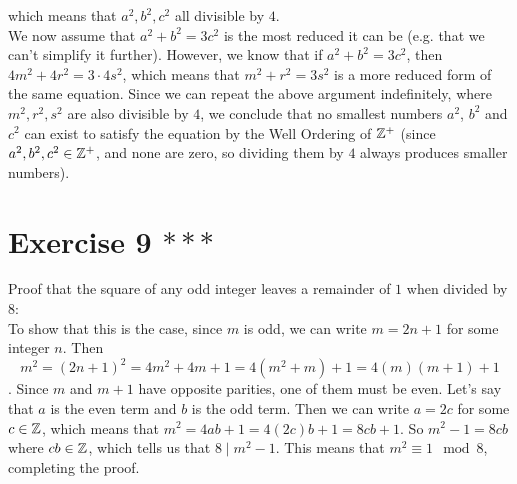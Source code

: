 \documentclass[12pt]{article}
\begin{document}
    which means that $a^2, b^2, c^2$ all divisible by $4$. \\
    We now assume that $a^2 + b^2 = 3c^2$
    is the most reduced it can be
    (e.g. that we can't simplify it further).
    However, we know that if $a^2 + b^2 = 3c^2$,
    then $4m^2 + 4r^2 = 3 \cdot 4s^2$,
    which means that $m^2 + r^2 = 3s^2$
    is a more reduced form of the same equation. 
    Since we can repeat the above argument indefinitely,
    where $m^2, r^2, s^2$ are also divisible by $4$,
    we conclude that no smallest numbers $a^2$, $b^2$ and $c^2$
    can exist to satisfy the equation
    by the Well Ordering of $\mathbb{Z}^+$
    (since $a^2, b^2, c^2 \in \mathbb{Z}^+$,
    and none are zero,
    so dividing them by $4$ always produces smaller numbers). \\

    \section*{Exercise 9 $***$}
    Proof that the square of any odd integer leaves
    a remainder of $1$ when divided by $8$: \\
    To show that this is the case, since $m$ is odd,
    we can write $m = 2n+1$ for some integer $n$.
    Then
    \[ m^2 = (2n+1)^2 = 4m^2+4m+1 = 4(m^2 + m) + 1
    = 4(m)(m+1) + 1 \].
    Since $m$ and $m+1$ have opposite parities,
    one of them must be even.
    Let's say that $a$ is the even term and $b$ is the odd term.
    Then we can write $a = 2c$ for some $c \in \mathbb{Z}$,
    which means that $m^2 = 4ab + 1 = 4(2c)b + 1 = 8cb + 1$.
    So $m^2 - 1 = 8cb$ where $cb \in \mathbb{Z}$,
    which tells us that $8 \mid m^2 - 1$.
    This means that $m^2 \equiv 1 \mod 8$,
    completing the proof. \\
\end{document}
